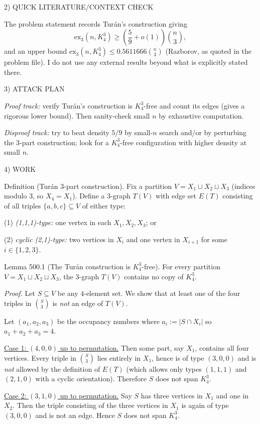 2) QUICK LITERATURE/CONTEXT CHECK

The problem statement records Tur\'an's construction giving
\[\mathrm{ex}_3(n,K_4^3)\ge \left(\frac{5}{9}+o(1)\right)\binom{n}{3},\]
and an upper bound $\mathrm{ex}_3(n,K_4^3)\le 0.5611666\binom{n}{3}$ (Razborov, as quoted in the problem file). I do not use any external results beyond what is explicitly stated there.

3) ATTACK PLAN

\emph{Proof track:} verify Tur\'an's construction is $K_4^3$-free and count its edges (gives a rigorous lower bound). Then sanity-check small $n$ by exhaustive computation.

\emph{Disproof track:} try to beat density $5/9$ by small-$n$ search and/or by perturbing the 3-part construction; look for a $K_4^3$-free configuration with higher density at small $n$.

4) WORK

Definition (Tur\'an 3-part construction).
Fix a partition $V=X_1\sqcup X_2\sqcup X_3$ (indices modulo $3$, so $X_4=X_1$). Define a $3$-graph $T(V)$ with edge set $E(T)$ consisting of all triples $\{a,b,c\}\subseteq V$ of either type:

(1) \emph{(1,1,1)-type:} one vertex in each $X_1,X_2,X_3$; or

(2) \emph{cyclic (2,1)-type:} two vertices in $X_i$ and one vertex in $X_{i+1}$ for some $i\in\{1,2,3\}$.

Lemma 500.1 (The Tur\'an construction is $K_4^3$-free).
For every partition $V=X_1\sqcup X_2\sqcup X_3$, the $3$-graph $T(V)$ contains no copy of $K_4^3$.

\emph{Proof.}
Let $S\subseteq V$ be any $4$-element set. We show that at least one of the four triples in $\binom{S}{3}$ is \emph{not} an edge of $T(V)$.

Let $(a_1,a_2,a_3)$ be the occupancy numbers where $a_i:=\lvert S\cap X_i\rvert$ so $a_1+a_2+a_3=4$.

\underline{Case 1: $(4,0,0)$ up to permutation.}
Then some part, say $X_1$, contains all four vertices. Every triple in $\binom{S}{3}$ lies entirely in $X_1$, hence is of type $(3,0,0)$ and is \emph{not} allowed by the definition of $E(T)$ (which allows only types $(1,1,1)$ and $(2,1,0)$ with a cyclic orientation). Therefore $S$ does not span $K_4^3$.

\underline{Case 2: $(3,1,0)$ up to permutation.}
Say $S$ has three vertices in $X_1$ and one in $X_2$. Then the triple consisting of the three vertices in $X_1$ is again of type $(3,0,0)$ and is not an edge. Hence $S$ does not span $K_4^3$.

